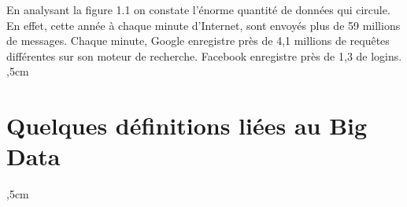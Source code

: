 En analysant la figure 1.1 on constate l’énorme quantité de données qui circule. En effet, cette année à chaque minute d’Internet, sont envoyés plus de 59 millions de messages. Chaque minute, Google enregistre près de 4,1 millions de requêtes différentes sur son moteur de recherche. Facebook enregistre près de 1,3 de logins.\\ 

,5cm


\section{Quelques définitions liées au Big Data}
,5cm

 







